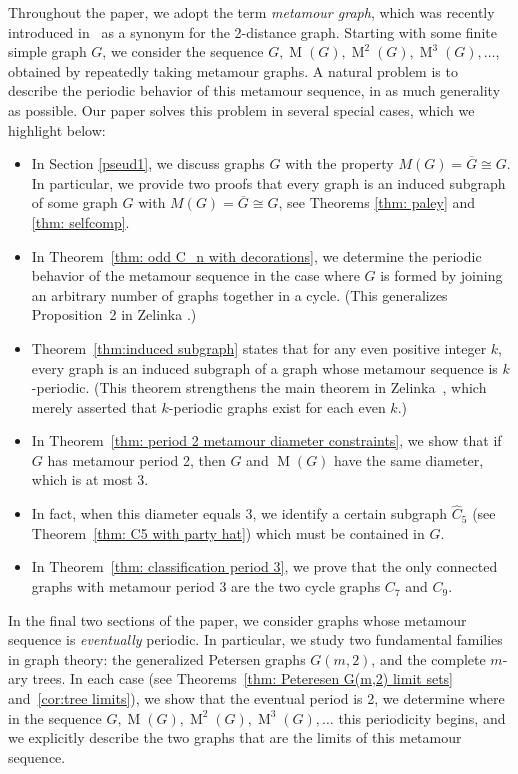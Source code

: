 \documentclass[12pt]{amsart}
\theoremstyle{definition}
\theoremstyle{remark}
\numberwithin{equation}{section}
\numberwithin{figure}{section}
\newcommand{\M}{\operatorname{M}}
\begin{document}
Throughout the paper, we adopt the term \emph{metamour graph}, which was recently introduced in~\cite{GaarKrenn2023} as a synonym for the 2-distance graph.
Starting with some finite simple graph $G$, we consider the sequence $G, \M(G), \M^2(G), \M^3(G), \ldots$, obtained by repeatedly taking metamour graphs.
A natural problem is to describe the periodic behavior of this metamour sequence, in as much generality as possible.
Our paper solves this problem in several special cases, which we highlight below:
\begin{itemize}
    \item In Section \ref{pseud1}, we discuss graphs $G$ with the property $M(G)=\overline{G}\cong G$. In particular, we provide two proofs that every graph is an induced subgraph of some graph $G$ with $M(G)=\overline{G}\cong G$, see Theorems \ref{thm: paley} and \ref{thm: selfcomp}.
    \item In Theorem~\ref{thm: odd C_n with decorations}, we determine the periodic behavior of the metamour sequence in the case where $G$ is formed by joining an arbitrary number of graphs together in a cycle.
    (This generalizes Proposition~2 in Zelinka \cite{Zelinka}.)
    \item Theorem~\ref{thm:induced subgraph} states that for any even positive integer $k$, every graph is an induced subgraph of a graph whose metamour sequence is $k$-periodic.
    (This theorem strengthens the main theorem in Zelinka~\cite[p.~268]{Zelinka}, which merely asserted that $k$-periodic graphs exist for each even $k$.)
    \item In Theorem~\ref{thm: period 2 metamour diameter constraints}, we show that if $G$ has metamour period 2, then $G$ and $\M(G)$ have the same diameter, which is at most $3$.
    \item In fact, when this diameter equals 3, we identify a certain subgraph $\widehat{C}_5$ (see Theorem~\ref{thm: C5 with party hat}) which must be contained in $G$.
    \item In Theorem~\ref{thm: classification period 3}, we prove that the only connected graphs with metamour period 3 are the two cycle graphs $C_7$ and $C_9$.
\end{itemize}

In the final two sections of the paper, we consider graphs whose metamour sequence is \emph{eventually} periodic.
In particular, we study two fundamental families in graph theory: the generalized Petersen graphs $G(m,2)$, and the complete $m$-ary trees.
In each case (see Theorems~\ref{thm: Peteresen G(m,2) limit sets} and~\ref{cor:tree limits}), we show that the eventual period is 2, we determine where in the sequence $G, \M(G), \M^2(G), \M^3(G), \ldots$ this periodicity begins, and we explicitly describe the two graphs that are the limits of this metamour sequence.
\end{document}

